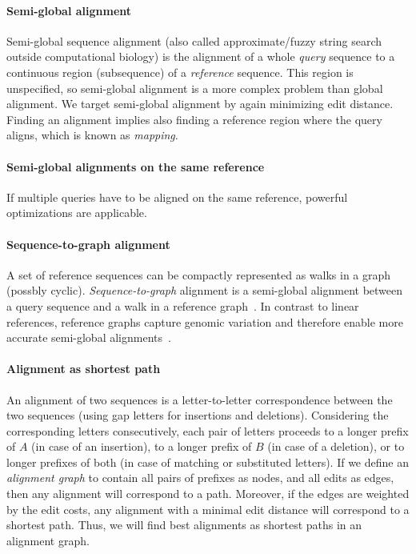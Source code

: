 \paragraph{Semi-global alignment}
Semi-global sequence alignment (also called approximate/fuzzy string search
outside computational biology) is the alignment of a whole \emph{query} sequence
to a continuous region (subsequence) of a \emph{reference} sequence. This region
is unspecified, so semi-global alignment is a more complex problem than global
alignment. We target semi-global alignment by again minimizing edit distance.
Finding an alignment implies also finding a reference region where the query
aligns, which is known as \emph{mapping}. 

\paragraph{Semi-global alignments on the same reference}
If multiple queries have to be aligned on the same reference, powerful
optimizations are applicable.

\paragraph{Sequence-to-graph alignment}
A set of reference sequences can be compactly represented as walks in a graph
(possbly cyclic). \emph{Sequence-to-graph} alignment is a semi-global alignment
between a query sequence and a walk in a reference
graph~\cite{jain_complexity_2019}. In contrast to linear references, reference
graphs capture genomic variation and therefore enable more accurate semi-global
alignments~\citep{garrison_variation_2018}.

\paragraph{Alignment as shortest path}
An alignment of two sequences is a letter-to-letter correspondence between the
two sequences (using gap letters for insertions and deletions). Considering the
corresponding letters consecutively, each pair of letters proceeds to a longer
prefix of $A$ (in case of an insertion), to a longer prefix of $B$ (in case of a
deletion), or to longer prefixes of both (in case of matching or substituted
letters). If we define an \emph{alignment graph} to contain all pairs of
prefixes as nodes, and all edits as edges, then any alignment will correspond to
a path. Moreover, if the edges are weighted by the edit costs, any alignment
with a minimal edit distance will correspond to a shortest path. Thus, we will
find best alignments as shortest paths in an alignment graph.